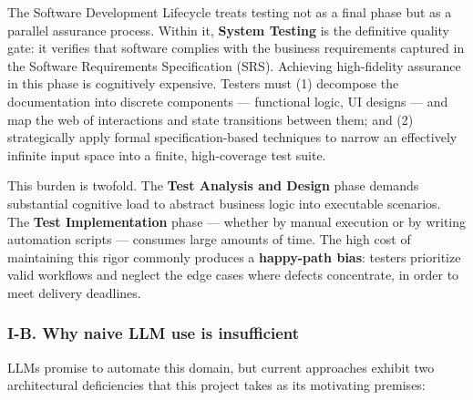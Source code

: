 \documentclass[
]{article}
\begin{document}
The Software Development Lifecycle treats testing not as a final phase
but as a parallel assurance process. Within it, \textbf{System Testing}
is the definitive quality gate: it verifies that software complies with
the business requirements captured in the Software Requirements
Specification (SRS). Achieving high-fidelity assurance in this phase is
cognitively expensive. Testers must (1) decompose the documentation into
discrete components --- functional logic, UI designs --- and map the web
of interactions and state transitions between them; and (2)
strategically apply formal specification-based techniques to narrow an
effectively infinite input space into a finite, high-coverage test
suite.

This burden is twofold. The \textbf{Test Analysis and Design} phase
demands substantial cognitive load to abstract business logic into
executable scenarios. The \textbf{Test Implementation} phase --- whether
by manual execution or by writing automation scripts --- consumes large
amounts of time. The high cost of maintaining this rigor commonly
produces a \textbf{happy-path bias}: testers prioritize valid workflows
and neglect the edge cases where defects concentrate, in order to meet
delivery deadlines.

\subsubsection{I-B. Why naive LLM use is
insufficient}\label{i-b.-why-naive-llm-use-is-insufficient}

LLMs promise to automate this domain, but current approaches exhibit two
architectural deficiencies that this project takes as its motivating
premises:
\end{document}
